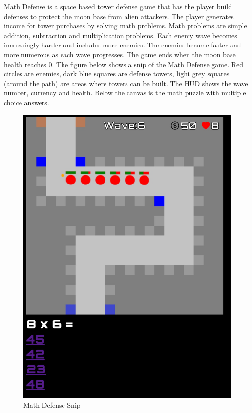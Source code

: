 \documentclass[12pt]{article}
\begin{document}
    Math Defense is a space based tower defense game that has the player build defenses to protect the moon base from alien attackers.  The player generates income for tower purchases by solving math problems.  Math problems are simple addition, subtraction and multiplication problems. Each enemy wave becomes increasingly harder and includes more enemies.  The enemies become faster and more numerous as each wave progresses.   The game ends when the moon base health reaches 0. The figure below shows a snip of the Math Defense game.  Red circles are enemies, dark blue squares are defense towers, light grey squares (around the path) are areas where towers can be built.  The HUD shows the wave number, currency and health.  Below the canvas is the math puzzle with multiple choice answers\cite{MozJS}\cite{RMO}\cite{CanCC}.
    \begin{figure}[ht]
        \centering
            \includegraphics[height=0.30\textheight]{mathDefenseSnip.jpg}
            \caption{Math Defense Snip} 
    \end{figure}

\newpage
\printbibliography
\end{document}
